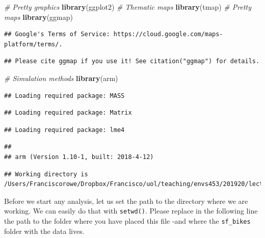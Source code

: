 \documentclass[]{book}
\newenvironment{Shaded}{\begin{snugshade}}{\end{snugshade}}
\newcommand{\KeywordTok}[1]{\textcolor[rgb]{0.13,0.29,0.53}{\textbf{#1}}}
\newcommand{\CommentTok}[1]{\textcolor[rgb]{0.56,0.35,0.01}{\textit{#1}}}
\newcommand{\NormalTok}[1]{#1}
\begin{document}
\begin{Shaded}
\begin{Highlighting}[]
\CommentTok{# Pretty graphics}
\KeywordTok{library}\NormalTok{(ggplot2)}
\CommentTok{# Thematic maps}
\KeywordTok{library}\NormalTok{(tmap)}
\CommentTok{# Pretty maps}
\KeywordTok{library}\NormalTok{(ggmap)}
\end{Highlighting}
\end{Shaded}

\begin{verbatim}
## Google's Terms of Service: https://cloud.google.com/maps-platform/terms/.
\end{verbatim}

\begin{verbatim}
## Please cite ggmap if you use it! See citation("ggmap") for details.
\end{verbatim}

\begin{Shaded}
\begin{Highlighting}[]
\CommentTok{# Simulation methods}
\KeywordTok{library}\NormalTok{(arm)}
\end{Highlighting}
\end{Shaded}

\begin{verbatim}
## Loading required package: MASS
\end{verbatim}

\begin{verbatim}
## Loading required package: Matrix
\end{verbatim}

\begin{verbatim}
## Loading required package: lme4
\end{verbatim}

\begin{verbatim}
## 
## arm (Version 1.10-1, built: 2018-4-12)
\end{verbatim}

\begin{verbatim}
## Working directory is /Users/Franciscorowe/Dropbox/Francisco/uol/teaching/envs453/201920/lectures/san
\end{verbatim}

Before we start any analysis, let us set the path to the directory where
we are working. We can easily do that with \texttt{setwd()}. Please
replace in the following line the path to the folder where you have
placed this file -and where the \texttt{sf\_bikes} folder with the data
lives.
\end{document}
